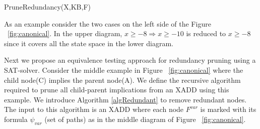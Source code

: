 \documentclass[twoside,11pt]{article}
\begin{document}
\decmargin{1em}
\incmargin{1em}
\linesnumbered
\begin{algorithm}[t!]
\BlankLine
{}
\caption{{\sc PruneRedundancy}(X,KB,F)  \label{algRedundant}}
\end{algorithm}
\decmargin{1em}
As an example consider the two cases on the left side of the Figure ~\ref{fig:canonical}. In the upper diagram,  $x \geq -8  \Rightarrow x \geq -10 $ is reduced to $x\geq-8$ since it covers all the state space in the lower diagram.   

Next we propose an equivalence testing approach for redundancy pruning using a SAT-solver. Consider the middle example in Figure  ~\ref{fig:canonical} where the child node(C) implies the parent node(A). We define the recursive algorithm required to prune all child-parent implications from an XADD using this example. We introduce Algorithm \ref{algRedundant} to remove redundant nodes. 
The input to this algorithm is an XADD where each node $F^{var}$ is marked with its formula $\psi_{var}$ (set of paths) as in the middle diagram of Figure  ~\ref{fig:canonical}. 
\end{document}
